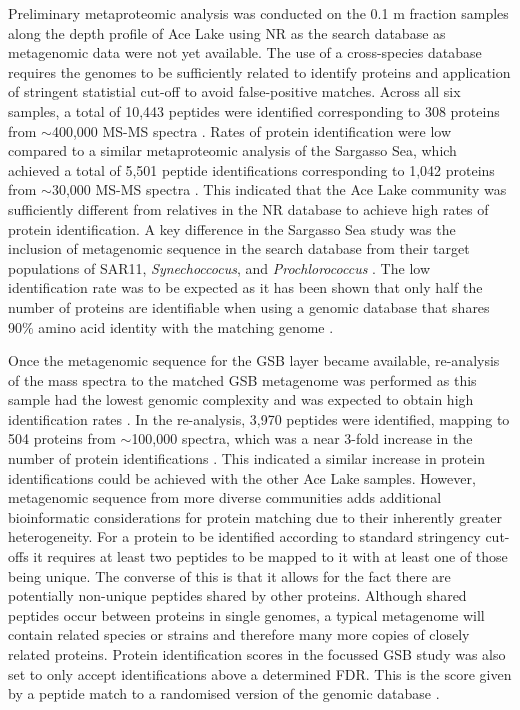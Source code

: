 Preliminary metaproteomic analysis was conducted on the 0.1 \textmu{}m fraction samples along the depth profile of Ace Lake using \ac{NR} as the search database \cite{Ng2010b} as metagenomic data were not yet available.
The use of a cross-species database requires the genomes to be sufficiently related to identify proteins and application of stringent statistial cut-off to avoid false-positive matches.
Across all six samples, a total of 10,443 peptides were identified corresponding to 308 proteins from $\sim$400,000 \ac{MS-MS} spectra \cite{Ng2010b}.
Rates of protein identification were low compared to a similar metaproteomic analysis of the Sargasso Sea, which achieved  a total of 5,501 peptide identifications corresponding to 1,042 proteins from $\sim$30,000 \ac{MS-MS} spectra \cite{Sowell2009}. 
This indicated that the Ace Lake community was sufficiently different from relatives in the \ac{NR} database to achieve high rates of protein identification.
A key difference in the Sargasso Sea study was the inclusion of metagenomic sequence in the search database from their target populations of SAR11, \emph{Synechoccocus}, and \emph{Prochlorococcus} \cite{Sowell2009}.
The low identification rate was to be expected as it has been shown that only half the number of proteins are identifiable when using a genomic database that shares 90\% amino acid identity with the matching genome \cite{Denef2007}.

Once the metagenomic sequence for the \ac{GSB} layer became available, re-analysis of the mass spectra to the matched \ac{GSB} metagenome was performed as this sample had the lowest genomic complexity and was expected to obtain high identification rates \cite{Ng2010a, Ng2010b}.
In the re-analysis, 3,970 peptides were identified, mapping to 504 proteins from $\sim$100,000 spectra, which was a near 3-fold increase in the number of protein identifications \cite{Ng2010a, Ng2010b}.
This indicated a similar increase in protein identifications could be achieved with the other Ace Lake samples.
However, metagenomic sequence from more diverse communities adds additional bioinformatic considerations for protein matching due to their inherently greater heterogeneity.
For a protein to be identified according to standard stringency cut-offs it requires at least two peptides to be mapped to it with at least one of those being unique. 
The converse of this is that it allows for the fact there are potentially non-unique peptides shared by other proteins.
Although shared peptides occur between proteins in single genomes, a typical metagenome will contain related species or strains and therefore many more copies of closely related proteins.
Protein identification scores in the focussed \ac{GSB} study was also set to only accept identifications above a determined \ac{FDR}.
This is the score given by a peptide match to a randomised version of the genomic database \cite{Ng2010a, Ng2010b}.


